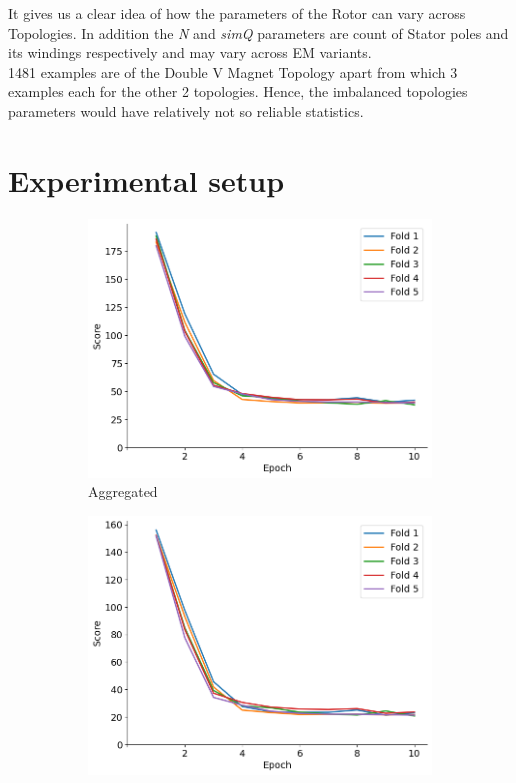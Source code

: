 \documentclass{report} %
\begin{document}
It gives us a clear idea of how the parameters of the Rotor can vary across Topologies.
In addition the \textit{N} and \textit{simQ} parameters are count of Stator poles and its windings respectively and may vary across \ac{EM} variants.\\
1481 examples are of the Double V Magnet Topology apart from which 3 examples each for the other 2 topologies.
Hence, the imbalanced topologies parameters would have relatively not so reliable statistics.\\ 

\section{Experimental setup}
\label{sec:Experimental setup}

\begin{figure}[H]
    \centering
    \begin{subfigure}{0.32\textwidth}
        \centering
        \includegraphics[width=\textwidth]{./ReportImages/train_score.png}
        \caption{\centering Aggregated}
        \label{fig:Aggregated Training Score}
    \end{subfigure}\hfill
    \begin{subfigure}{0.32\textwidth}
        \centering
        \includegraphics[width=\textwidth]{./ReportImages/train_score_y1.png}

\end{subfigure}
\end{figure}
\end{document}
